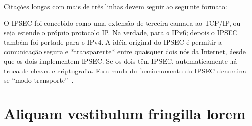 Citações longas com mais de três linhas devem seguir ao seguinte formato:

\begin{citacao}
O IPSEC foi concebido como uma extensão de terceira camada ao TCP/IP, ou seja estende o próprio protocolo IP. Na verdade, para o IPv6; depois o IPSEC também foi portado para o IPv4.
A idéia original do IPSEC é permitir a comunicação segura e *transparente* entre quaisquer dois nós da Internet, desde que os dois implementem IPSEC. Se os dois têm IPSEC, automaticamente há troca de chaves e criptografia. Esse modo de funcionamento do IPSEC denomina-se ``modo transporte''~\cite{epx}. 
\end{citacao}

\section{Aliquam vestibulum fringilla lorem}

\lipsum[1]

\lipsum[2-3]
